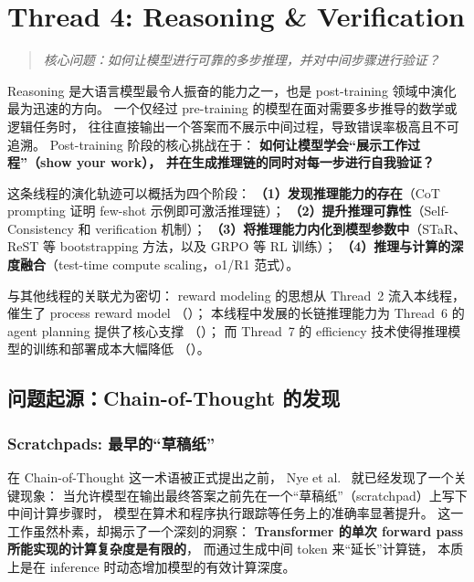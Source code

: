 \section{Thread 4: Reasoning \& Verification}
\label{sec:t4}

\begin{quote}
\textit{核心问题：如何让模型进行可靠的多步推理，并对中间步骤进行验证？}
\end{quote}

\noindent
Reasoning 是大语言模型最令人振奋的能力之一，也是 post-training 领域中演化最为迅速的方向。
一个仅经过 pre-training 的模型在面对需要多步推导的数学或逻辑任务时，
往往直接输出一个答案而不展示中间过程，导致错误率极高且不可追溯。
Post-training 阶段的核心挑战在于：
\textbf{如何让模型学会``展示工作过程''（show your work），
并在生成推理链的同时对每一步进行自我验证？}

这条线程的演化轨迹可以概括为四个阶段：
\textbf{（1）发现推理能力的存在}（CoT prompting 证明 few-shot 示例即可激活推理链）；
\textbf{（2）提升推理可靠性}（Self-Consistency 和 verification 机制）；
\textbf{（3）将推理能力内化到模型参数中}（STaR、ReST 等 bootstrapping 方法，以及 GRPO 等 RL 训练）；
\textbf{（4）推理与计算的深度融合}（test-time compute scaling，o1/R1 范式）。

与其他线程的关联尤为密切：
reward modeling 的思想从 Thread~2 流入本线程，催生了 process reward model
（）；
本线程中发展的长链推理能力为 Thread~6 的 agent planning 提供了核心支撑
（）；
而 Thread~7 的 efficiency 技术使得推理模型的训练和部署成本大幅降低
（）。


\subsection{问题起源：Chain-of-Thought 的发现}
\label{sec:t4-origin}

\subsubsection{Scratchpads: 最早的``草稿纸''}

在 Chain-of-Thought 这一术语被正式提出之前，
Nye et al.\ \cite{nye2021scratchpad} 就已经发现了一个关键现象：
当允许模型在输出最终答案之前先在一个``草稿纸''（scratchpad）上写下中间计算步骤时，
模型在算术和程序执行跟踪等任务上的准确率显著提升。
这一工作虽然朴素，却揭示了一个深刻的洞察：
\textbf{Transformer 的单次 forward pass 所能实现的计算复杂度是有限的}，
而通过生成中间 token 来``延长''计算链，
本质上是在 inference 时动态增加模型的有效计算深度。

